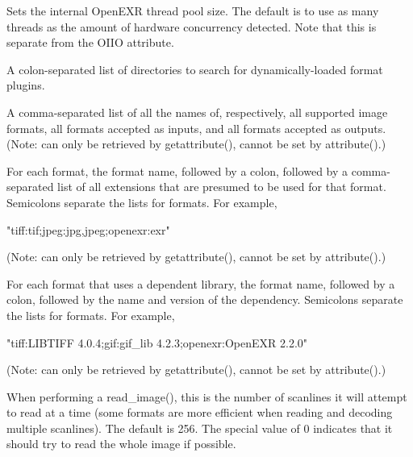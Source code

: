 \vspace{10pt}
Sets the internal OpenEXR thread pool size. The default is to use as many
threads as the amount of hardware concurrency detected.
Note that this is separate from the OIIO
 attribute.
\apiend

\vspace{10pt}
A colon-separated list of directories to search for 
dynamically-loaded format plugins.
\apiend

\vspace{10pt}
  
A comma-separated list of all the names of, respectively, all supported
image formats, all formats accepted as inputs, and all formats accepted
as outputs.  (Note: can only be retrieved
by {\cf getattribute()}, cannot be set by {\cf attribute()}.)
\apiend

\vspace{10pt}
For each format, the format name, followed by a colon, followed by
a comma-separated list of all extensions that are presumed to be used
for that format.  Semicolons separate the lists for formats.  For
example,
\begin{code}
     "tiff:tif;jpeg:jpg,jpeg;openexr:exr"
\end{code}
(Note: can only be retrieved
by {\cf getattribute()}, cannot be set by {\cf attribute()}.)
\apiend

\vspace{10pt}
For each format that uses a dependent library, the format name, followed by
a colon, followed by the name and version of the dependency. Semicolons
separate the lists for formats.  For example,
\begin{code}
     "tiff:LIBTIFF 4.0.4;gif:gif_lib 4.2.3;openexr:OpenEXR 2.2.0"
\end{code}
(Note: can only be retrieved by {\cf getattribute()}, cannot be set by
{\cf attribute()}.)
\apiend

\vspace{10pt}
When performing a {\cf read_image()}, this is the number of scanlines it
will attempt to read at a time (some formats are more efficient when reading
and decoding multiple scanlines).  The default is 256.  The special value
of 0 indicates that it should try to read the whole image if possible.
\apiend

